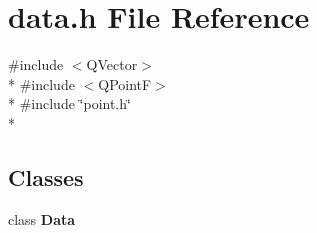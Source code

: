 \section{data.\+h File Reference}
\label{curve_2data_8h}
{\ttfamily \#include $<$Q\+Vector$>$}\\*
{\ttfamily \#include $<$Q\+PointF$>$}\\*
{\ttfamily \#include \char`\"{}point.\+h\char`\"{}}\\*
\subsection*{Classes}
\begin{DoxyCompactItemize}
\item 
class {\bf Data}
\end{DoxyCompactItemize}
